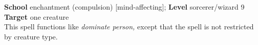 \textbf{School} enchantment (compulsion) [mind-affecting]; \textbf{Level} sorcerer/wizard 9\\
\textbf{Target} one creature\\
This spell functions like \textit{dominate person, }except that the spell is not restricted by creature type.\\

